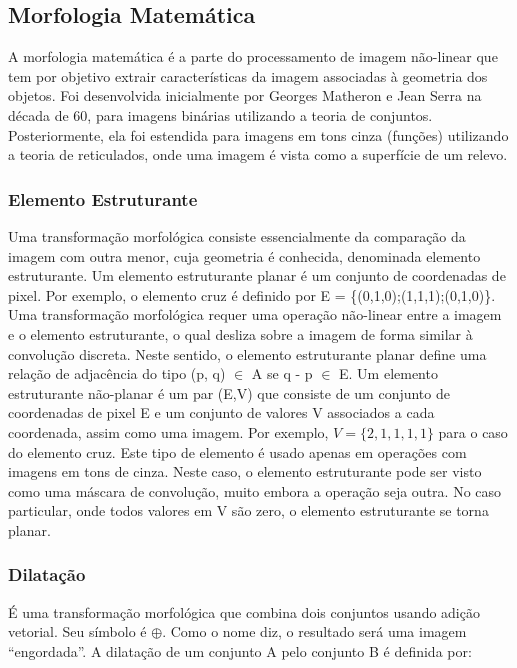 \documentclass[letterpaper, 10 pt, conference]{ieeeconf}  %
\begin{document}
\subsection{Morfologia Matemática}

A morfologia matemática é a parte do processamento de imagem não-linear que tem por objetivo extrair características da imagem associadas à geometria dos objetos. Foi desenvolvida inicialmente por Georges Matheron e Jean Serra na década de 60, para imagens binárias utilizando a teoria de conjuntos. Posteriormente, ela foi estendida para imagens em tons cinza (funções) utilizando a teoria de reticulados, onde uma imagem é vista como a superfície de um relevo.\\

\subsubsection{Elemento Estruturante}

Uma transformação morfológica consiste essencialmente da comparação da imagem com outra menor, cuja geometria é conhecida, denominada elemento estruturante. Um elemento estruturante planar é um conjunto de coordenadas de pixel. Por exemplo, o elemento cruz é definido por E = \{(0,1,0);(1,1,1);(0,1,0)\}. Uma transformação morfológica requer uma operação não-linear entre a imagem e o elemento estruturante, o qual desliza sobre a imagem de forma similar à convolução discreta. Neste sentido, o elemento estruturante planar define uma relação de adjacência do tipo (p, q) $\in$ A se q - p $\in$ E. Um elemento estruturante não-planar é um par (E,V) que consiste de um conjunto de coordenadas de pixel E e um conjunto de valores V associados a cada coordenada, assim como uma imagem. Por exemplo, $ V = \{2, 1, 1, 1, 1\} $ para o caso do elemento cruz. Este tipo de elemento é usado apenas em operações com imagens em tons de cinza. Neste caso, o elemento estruturante pode ser visto como uma máscara de convolução, muito embora a operação seja outra. No caso particular, onde todos valores em V são zero, o elemento estruturante se torna planar.\\

\subsubsection{Dilatação}

É uma transformação morfológica que combina dois conjuntos usando adição vetorial. Seu símbolo é $\oplus$. Como o nome diz, o resultado será uma imagem “engordada”. A dilatação de um conjunto A pelo conjunto B é definida por:
\end{document}
